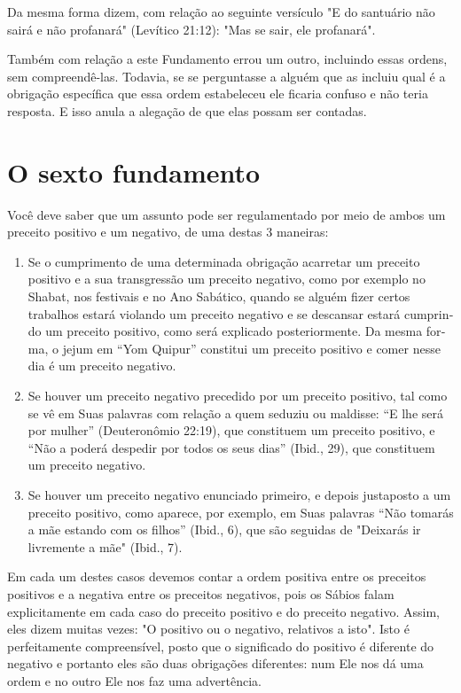 Da mesma forma dizem, com relação ao seguinte versículo "E do
santuário não sairá e não profanará" (Levítico 21:12): "Mas se sair, ele
profanará".

Também com relação a este Fundamento errou um outro, incluindo
essas ordens, sem compreendê-las. Todavia, se se perguntasse a alguém
que as incluiu qual é a obrigação específica que essa ordem estabeleceu ele
ficaria confuso e não teria resposta. E isso anula a alegação de que elas possam
ser contadas.

\chapter*{O sexto fundamento}

Você deve saber que um assunto pode ser regulamentado por meio de ambos
um preceito positivo e um negativo, de uma destas 3 maneiras:

\begin{enumerate}
\item 
 Se o cumprimento de uma determinada obrigação acarretar um preceito
 positivo e a sua transgressão um preceito negativo, como por exem­plo
 no Shabat, nos festivais e no Ano Sabático, quando se alguém fizer
 certos trabalhos estará violando um preceito negativo e se descansar
 estará cumprin­do um preceito positivo, como será explicado
 posteriormente. Da mesma for­ma, o jejum em ``Yom Quipur'' constitui um
 preceito positivo e comer nesse dia é um preceito negativo.
 
\item
 Se houver um preceito negativo precedido por um preceito posi­tivo,
 tal como se vê em Suas palavras com relação a quem seduziu ou
 maldisse: ``E lhe será por mulher'' (Deuteronômio 22:19), que constituem
 um preceito positivo, e ``Não a poderá despedir por todos os seus dias''
 (Ibid., 29), que cons­tituem um preceito negativo.
 
\item
 Se houver um preceito negativo enunciado primeiro, e depois
 jus­taposto a um preceito positivo, como aparece, por exemplo, em Suas
 palavras ``Não tomarás a mãe estando com os filhos'' (Ibid., 6), que são
 seguidas de "Dei­xarás ir livremente a mãe" (Ibid., 7).
\end{enumerate}


Em cada um destes casos devemos contar a ordem positiva entre os
preceitos positivos e a negativa entre os preceitos negativos, pois os
Sábios falam explicitamente em cada caso do preceito positivo e do preceito
negativo. Assim, eles dizem muitas vezes: "O positivo ou o negativo,
relativos a isto". Isto é perfeitamente compreensível, posto que o
significado do positivo é dife­rente do negativo e portanto eles são
duas obrigações diferentes: num Ele nos dá uma ordem e no outro Ele nos
faz uma advertência.

